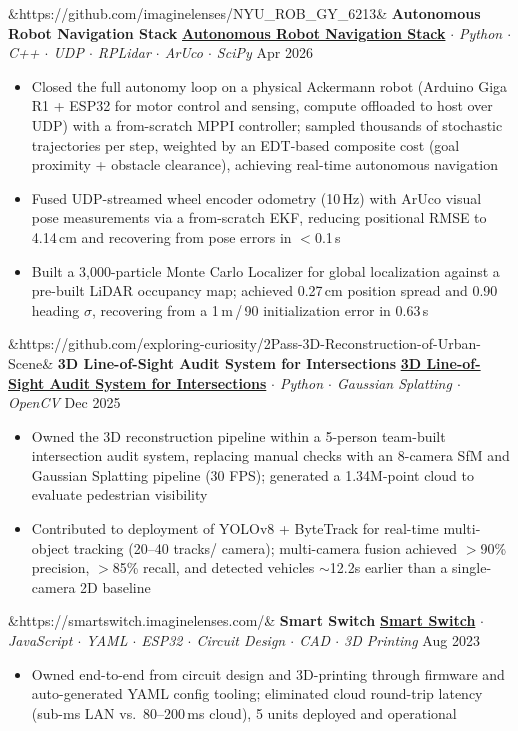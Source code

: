 \documentclass[11pt]{article}
\newcommand{\entryhead}[4][]{%
  \noindent
  \ifx&#1&%
    \textbf{#2}%
  \else
    \href{#1}{\textbf{#2}}%
  \fi
  {\small\textit{ $\cdot$ #3}}%
  \hfill {\small #4}%
}
\begin{document}
\vspace{1pt}
\entryhead[https://github.com/imaginelenses/NYU_ROB_GY_6213]
  {Autonomous Robot Navigation Stack}
  {Python $\cdot$ C++ $\cdot$ UDP $\cdot$ RPLidar $\cdot$ ArUco $\cdot$ SciPy}
  {Apr 2026}
\begin{itemize}
  \item Closed the full autonomy loop on a physical Ackermann robot (Arduino Giga R1 + ESP32 for motor control and sensing, compute offloaded to host over UDP) with a from-scratch MPPI controller; sampled thousands of stochastic trajectories per step, weighted by an EDT-based composite cost (goal proximity + obstacle clearance), achieving real-time autonomous navigation
  \item Fused UDP-streamed wheel encoder odometry (10\,Hz) with ArUco visual pose measurements via a from-scratch EKF, reducing positional RMSE to 4.14\,cm and recovering from pose errors in $<$0.1\,s
  \item Built a 3,000-particle Monte Carlo Localizer for global localization against a pre-built LiDAR occupancy map; achieved 0.27\,cm position spread and 0.90\textdegree{} heading $\sigma$, recovering from a 1\,m\,/\,90\textdegree{} initialization error in 0.63\,s
\end{itemize}

\vspace{1pt}
\entryhead[https://github.com/exploring-curiosity/2Pass-3D-Reconstruction-of-Urban-Scene]
  {3D Line-of-Sight Audit System for Intersections}
  {Python $\cdot$ Gaussian Splatting $\cdot$ OpenCV}
  {Dec 2025}
\begin{itemize}
  \item Owned the 3D reconstruction pipeline within a 5-person team-built intersection audit system, replacing manual checks with an 8-camera SfM and Gaussian Splatting pipeline (30 FPS); generated a 1.34M-point cloud to evaluate pedestrian visibility
  \item Contributed to deployment of YOLOv8 + ByteTrack for real-time multi-object tracking (20--40 tracks/ camera); multi-camera fusion achieved ${>}$90\% precision, ${>}$85\% recall, and detected vehicles ${\sim}$12.2s earlier than a single-camera 2D baseline
\end{itemize}

\vspace{1pt}
\entryhead[https://smartswitch.imaginelenses.com/]
  {Smart Switch}
  {JavaScript $\cdot$ YAML $\cdot$ ESP32 $\cdot$ Circuit Design $\cdot$ CAD $\cdot$ 3D Printing}
  {Aug 2023}
\begin{itemize}
  \item Owned end-to-end from circuit design and 3D-printing through firmware and auto-generated YAML config tooling; eliminated cloud round-trip latency (sub-ms LAN vs.\ 80--200\,ms cloud), 5 units deployed and operational
\end{itemize}
\end{document}
